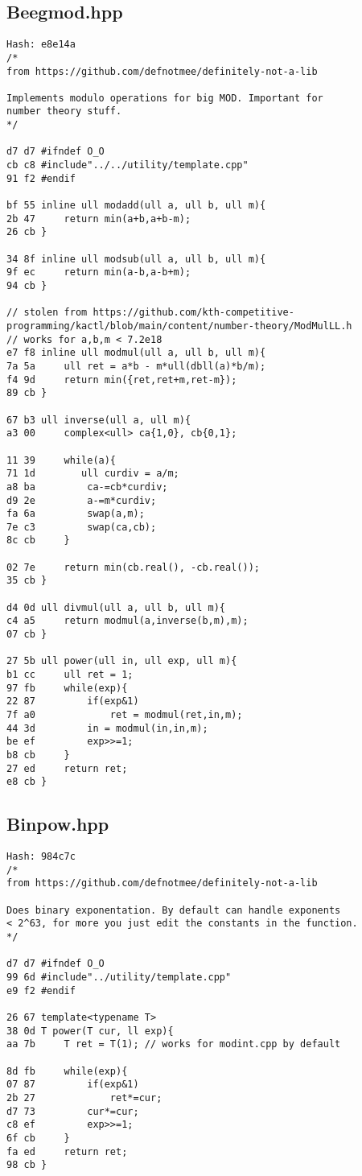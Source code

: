 \documentclass[11pt, a4paper, twoside]{article}
\begin{document}
\subsection{Beegmod.hpp}
\begin{lstlisting}
Hash: e8e14a
/*
from https://github.com/defnotmee/definitely-not-a-lib

Implements modulo operations for big MOD. Important for
number theory stuff.
*/

d7 d7 #ifndef O_O
cb c8 #include"../../utility/template.cpp"
91 f2 #endif

bf 55 inline ull modadd(ull a, ull b, ull m){
2b 47     return min(a+b,a+b-m);
26 cb }

34 8f inline ull modsub(ull a, ull b, ull m){
9f ec     return min(a-b,a-b+m);
94 cb }

// stolen from https://github.com/kth-competitive-programming/kactl/blob/main/content/number-theory/ModMulLL.h
// works for a,b,m < 7.2e18
e7 f8 inline ull modmul(ull a, ull b, ull m){
7a 5a     ull ret = a*b - m*ull(dbll(a)*b/m);
f4 9d     return min({ret,ret+m,ret-m});
89 cb }

67 b3 ull inverse(ull a, ull m){
a3 00     complex<ull> ca{1,0}, cb{0,1};
      
11 39     while(a){
71 1d        ull curdiv = a/m;
a8 ba         ca-=cb*curdiv;
d9 2e         a-=m*curdiv;
fa 6a         swap(a,m);
7e c3         swap(ca,cb);
8c cb     }
      
02 7e     return min(cb.real(), -cb.real());
35 cb }

d4 0d ull divmul(ull a, ull b, ull m){
c4 a5     return modmul(a,inverse(b,m),m);
07 cb }

27 5b ull power(ull in, ull exp, ull m){
b1 cc     ull ret = 1;
97 fb     while(exp){
22 87         if(exp&1)
7f a0             ret = modmul(ret,in,m);
44 3d         in = modmul(in,in,m);
be ef         exp>>=1;
b8 cb     }
27 ed     return ret;
e8 cb }
\end{lstlisting}

\subsection{Binpow.hpp}
\begin{lstlisting}
Hash: 984c7c
/*
from https://github.com/defnotmee/definitely-not-a-lib

Does binary exponentation. By default can handle exponents
< 2^63, for more you just edit the constants in the function.
*/

d7 d7 #ifndef O_O
99 6d #include"../utility/template.cpp"
e9 f2 #endif

26 67 template<typename T>
38 0d T power(T cur, ll exp){
aa 7b     T ret = T(1); // works for modint.cpp by default
      
8d fb     while(exp){
07 87         if(exp&1)
2b 27             ret*=cur;
d7 73         cur*=cur;
c8 ef         exp>>=1;
6f cb     }
fa ed     return ret;
98 cb }
\end{lstlisting}
\end{document}
